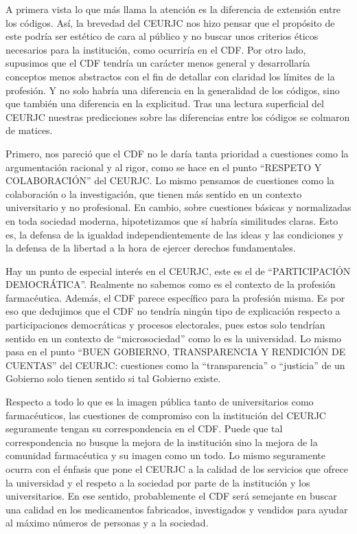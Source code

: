 \documentclass[11pt,a4paper]{article}
\begin{document}
A primera vista lo que más llama la atención es la diferencia de extensión entre los códigos. Así, la brevedad del CEURJC nos hizo pensar que el propósito de este podría ser estético de cara al público y no buscar unos criterios éticos necesarios para la institución, como ocurriría en el CDF. Por otro lado, supusimos que el CDF tendría un carácter menos general y desarrollaría conceptos menos abstractos con el fin de detallar con claridad los límites de la profesión. Y no solo habría una diferencia en la generalidad de los códigos, sino que también una diferencia en la explicitud. Tras una lectura superficial del CEURJC nuestras predicciones sobre las diferencias entre los códigos se colmaron de matices.
	
Primero, nos pareció que el CDF no le daría tanta prioridad a cuestiones como la argumentación racional y al rigor, como se hace en el punto ``RESPETO Y COLABORACIÓN'' del CEURJC. Lo mismo pensamos de cuestiones como la colaboración o la investigación, que tienen más sentido en un contexto universitario y no profesional. En cambio, sobre cuestiones básicas y normalizadas en toda sociedad moderna, hipotetizamos que sí habría similitudes claras. Esto es, la defensa de la igualdad independientemente de las ideas y las condiciones y la defensa de la libertad a la hora de ejercer derechos fundamentales.

Hay un punto de especial interés en el CEURJC, este es el de ``PARTICIPACIÓN DEMOCRÁTICA''. Realmente no sabemos como es el contexto de la profesión farmacéutica. Además, el CDF parece específico para la profesión misma. Es por eso que dedujimos que el CDF no tendría ningún tipo de explicación respecto a participaciones democráticas y procesos electorales, pues estos solo tendrían sentido en un contexto de ``microsociedad'' como lo es la universidad. Lo mismo pasa en el punto ``BUEN GOBIERNO, TRANSPARENCIA Y RENDICIÓN DE CUENTAS'' del CEURJC: cuestiones como la ``transparencia'' o ``justicia'' de un Gobierno solo tienen sentido si tal Gobierno existe.

Respecto a todo lo que es la imagen pública tanto de universitarios como farmacéuticos, las cuestiones de compromiso con la institución del CEURJC seguramente tengan su correspondencia en el CDF. Puede que tal correspondencia no busque la mejora de la institución sino la mejora de la comunidad farmacéutica y su imagen como un todo. Lo mismo seguramente ocurra con el énfasis que pone el CEURJC a la calidad de los servicios que ofrece la universidad y el respeto a la sociedad por parte de la institución y los universitarios. En ese sentido, probablemente el CDF será semejante en buscar una calidad en los medicamentos fabricados, investigados y vendidos para ayudar al máximo números de personas y a la sociedad. 
\end{document}
